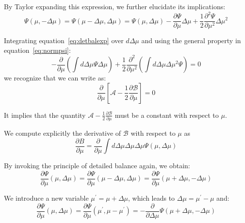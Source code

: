 
By Taylor expanding this expression, we further elucidate its implications:
%
\begin{equation}\label{eq:detbalexp}
\Psi(\mu, -\Delta\mu ) = \Psi(\mu-\Delta\mu , \Delta\mu )=\Psi(\mu,\Delta\mu )-\frac{\partial \Psi}{\partial \mu} \Delta\mu +\frac{1}{2}\frac{\partial^2 \Psi}{\partial\mu^2} \Delta\mu^2
\end{equation}

Integrating equation~\eqref{eq:detbalexp} over \(d\Delta\mu\) and using the general property in equation~\eqref{eq:normpsi}:
%
\begin{equation}
-\frac{\partial}{\partial \mu} \left( \int d\Delta\mu \Psi \Delta\mu \right) + \frac{1}{2}\frac{\partial^2}{\partial\mu^2}\left( \int d\Delta\mu \Delta\mu^2 \Psi \right) = 0
\end{equation}
%
we recognize that we can write as:
%
%
\begin{equation}
\frac{\partial}{\partial\mu}\left[ \mathcal A-\frac{1}{2}\frac{\partial \mathcal B}{\partial \mu}\right] = 0
\end{equation}

It implies that the quantity \( \mathcal A - \frac{1}{2} \frac{\partial \mathcal B}{\partial \mu} \) must be a constant with respect to \( \mu \).  

We compute explicitly the derivative of \( \mathcal B \) with respect to \( \mu \) as
%
\begin{equation}
\frac{\partial B}{\partial \mu} = \frac{\partial}{\partial\mu} \int d\Delta\mu \Delta\mu\Delta\mu \Psi(\mu,  \Delta\mu)
\end{equation}

By invoking the principle of detailed balance again, we obtain:
%
\begin{equation}
\frac{\partial\Psi}{\partial\mu}(\mu,\Delta\mu) = \frac{\partial\Psi}{\partial\mu}(\mu-\Delta\mu,\Delta\mu)=\frac{\partial\Psi}{\partial\mu}(\mu+\Delta\mu ,-\Delta\mu)
\end{equation}

We introduce a new variable \( \mu^\prime = \mu+\Delta\mu \), which leads to \( \Delta\mu = \mu^\prime -\mu \) and:
%
\begin{equation}\label{eq:newmuequation}
\frac{\partial\Psi}{\partial\mu}(\mu,\Delta\mu) = \frac{\partial\Psi}{\partial\mu}(\mu^\prime, \mu - \mu^\prime) = -\frac{\partial}{\partial \Delta\mu} \Psi(\mu+\Delta\mu, -\Delta\mu)
\end{equation}

